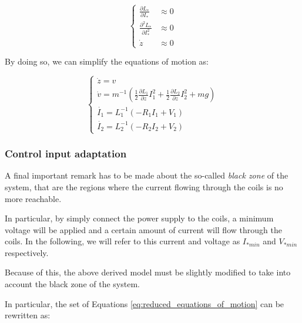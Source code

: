 \begin{equation}
    \begin{cases}
        \frac{\partial L_*}{\partial I_*}     & \approx 0 \\
        \frac{\partial^2 L_*}{\partial I_*^2} & \approx 0 \\
        \dot{z}                               & \approx 0
    \end{cases}
    \label{eq:model_reduction_conditions}
\end{equation}

By doing so, we can simplify the equations of motion as:

\begin{equation}
    \begin{cases}
        \dot{z} = v                                                                                                                                 \\
        \dot{v} = m^{-1} \left(\frac{1}{2} \frac{\partial L_1}{\partial z} I_1^2 + \frac{1}{2} \frac{\partial L_2}{\partial z} I_2^2 + m g  \right) \\
        \dot{I_1} = L_1^{-1} \left(- R_1 I_1 + V_1 \right)                                                                                          \\
        \dot{I_2} = L_2^{-1} \left(- R_2 I_2 + V_2 \right)
    \end{cases}
    \label{eq:reduced_equations_of_motion}
\end{equation}

\subsubsection{Control input adaptation}
\label{subsubsec:control_input_adaptation}

A final important remark has to be made about the so-called \textit{black zone} of the system, that are the regions where the current flowing through the coils is no more reachable.

In particular, by simply connect the power supply to the coils, a minimum voltage will be applied and a certain amount of current will flow through the coils.
In the following, we will refer to this current and voltage as $I_{*min}$ and $V_{*min}$ respectively.

Because of this, the above derived model must be slightly modified to take into account the black zone of the system.

In particular, the set of Equations \ref{eq:reduced_equations_of_motion} can be rewritten as:

